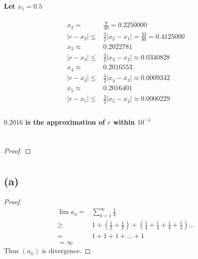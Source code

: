 \documentclass{article}
\begin{document}
        \paragraph{
            Let $x_1=0.5$
        }
            \begin{equation*}
                \begin{split}
                    x_2=& \frac{9}{40}=0.2250000\\
                    |r-x_2|\leq& \frac{3}{2}|x_2-x_1|=\frac{33}{80}=0.4125000\\
                    x_3\approx& 0.2022781\\
                    |r-x_3|\leq& \frac{3}{2}|x_3-x_2|\approx0.0340828\\
                    x_4\approx& 0.2016553\\
                    |r-x_4|\leq& \frac{3}{2}|x_4-x_3|\approx0.0009342\\
                    x_5\approx& 0.2016401\\
                    |r-x_5|\leq& \frac{3}{2}|x_5-x_4|\approx0.0000229\\
                \end{split}
            \end{equation*}
        \paragraph{
            $0.2016$ is the approximation of $r$ within $10^{-4}$
        }
    
    \section{}
    \begin{proof}
        
    \end{proof}
    \section{}
        \subsection*{(a)}
        \begin{proof}
            \begin{equation*}
                \begin{split}
                    \lim a_n=&\sum_{k=1}^\infty \frac{1}{k}\\
                        \geq& 1+(\frac{1}{2}+\frac{1}{2})+(\frac{1}{4}+\frac{1}{4}+\frac{1}{4}+\frac{1}{4})...\\
                        =&1+1+1+...+1\\
                        =\infty
                \end{split}
            \end{equation*}
            Thus $(a_n)$ is divergence.
        \end{proof}
\end{document}
